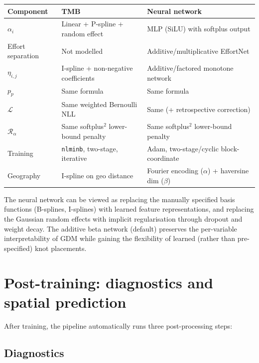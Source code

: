 \documentclass{article}
\begin{document}
\begin{center}
\begin{tabular}{l|l|l}
    Component & TMB & Neural network \\
    \hline
    $\alpha_i$ & Linear + P-spline + random effect & MLP (SiLU) with softplus output \\
    Effort separation & Not modelled & Additive/multiplicative EffortNet \\
    $\eta_{i,j}$ & I-spline + non-negative coefficients & Additive/factored monotone network \\
    $p_p$ & Same formula & Same formula \\
    $\mathcal{L}$ & Same weighted Bernoulli NLL & Same (+ retrospective correction) \\
    $\mathcal{R}_\alpha$ & Same softplus$^2$ lower-bound penalty & Same softplus$^2$ lower-bound penalty \\
    Training & \texttt{nlminb}, two-stage, iterative & Adam, two-stage/cyclic block-coordinate \\
    Geography & I-spline on geo distance & Fourier encoding ($\alpha$) + haversine dim ($\beta$) \\
\end{tabular}
\end{center}

The neural network can be viewed as replacing the manually specified basis functions (B-splines, I-splines) with learned feature representations, and replacing the Gaussian random effects with implicit regularisation through dropout and weight decay. The additive beta network (default) preserves the per-variable interpretability of GDM while gaining the flexibility of learned (rather than pre-specified) knot placements.

\section{Post-training: diagnostics and spatial prediction}

After training, the pipeline automatically runs three post-processing steps:

\subsection{Diagnostics}
\end{document}
